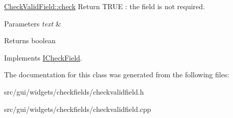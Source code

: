 \hyperlink{classCheckValidField_a192b1c9c84ea8897661425fd3c0b9e8e}{Check\+Valid\+Field\+::check} Return T\+R\+U\+E \+: the field is not required. 


\begin{DoxyParams}{Parameters}
{\em text} & \\
\hline
\end{DoxyParams}
\begin{DoxyReturn}{Returns}
boolean 
\end{DoxyReturn}


Implements \hyperlink{classICheckField_a6bd42b4d49c165cdd92822135123fd4b}{I\+Check\+Field}.



The documentation for this class was generated from the following files\+:\begin{DoxyCompactItemize}
\item 
src/gui/widgets/checkfields/checkvalidfield.\+h\item 
src/gui/widgets/checkfields/checkvalidfield.\+cpp\end{DoxyCompactItemize}
